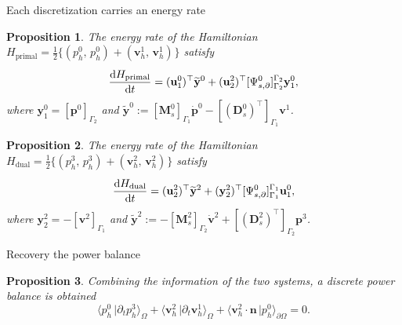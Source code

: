 \documentclass[aspectratio=169]{beamer}
\newcommand{\inpr}[3][]{\ensuremath{( #2, \, #3 )_{#1}}}
\newcommand{\dualpr}[3][]{\ensuremath{\langle #2 \, \vert #3 \rangle_{#1}}}
\newtheorem{proposition}{Proposition}
\begin{document}
\begin{frame}{Each discretization carries an energy rate}
	
	\begin{proposition}
		The energy rate of the Hamiltonian $H_{\mathrm{primal}} = \frac{1}{2}\{\inpr{p^0_h}{p^0_h} + \inpr{\bm{v}^1_h}{\bm{v}^1_h}\}$ satisfy
		\begin{equation*}
			\diff{{H}_{\mathrm{primal}}}{t} = (\mathbf{u}^{0}_1)^\top \widetilde{\mathbf{y}}^{0} + ({\mathbf{u}}^{2}_2)^\top[{\Psi}^{0}_{s, \partial}]_{\Gamma_2}^{\Gamma_2} \mathbf{y}^{0}_1,
		\end{equation*} 
		where ${\mathbf{y}}^{0}_1 = [\mathbf{p}^{0}]_{\Gamma_2}$ and $
			\widetilde{\mathbf{y}}^{0} := [\mathbf{M}^{0}_{s}]_{\Gamma_1} \dot{\mathbf{p}}^{0} -[(\mathbf{D}_{s}^{0})^\top]_{\Gamma_1} {\mathbf{v}}^1$.
	\end{proposition}

	\begin{proposition}
		The energy rate of the Hamiltonian $H_{\mathrm{dual}} = \frac{1}{2}\{\inpr{p^3_h}{p^3_h} + \inpr{\bm{v}^2_h}{\bm{v}^2_h}\}$ satisfy
	\begin{equation*}
		\diff{{H}_{\mathrm{dual}}}{t} = ({\mathbf{u}}^{2}_2)^\top \widetilde{\mathbf{y}}^{2} + (\mathbf{y}^{2}_2)^\top[{\Psi}^{0}_{s, \partial}]_{\Gamma_1}^{\Gamma_1} \mathbf{u}^{0}_1, 
	\end{equation*} 
	where ${\mathbf{y}}^{2}_2 = -[{\mathbf{v}}^{2}]_{\Gamma_1}$ and $\widetilde{\mathbf{y}}^{2} :=  -[\mathbf{M}^{2}_{s}]_{\Gamma_2} \dot{{\mathbf{v}}}^{2}  +[(\mathbf{D}_{s}^{2})^\top]_{\Gamma_2} {\mathbf{p}}^3$.
	\end{proposition}
\end{frame}

\begin{frame}{Recovery the power balance}
	
	\begin{proposition}
		Combining the information of the two systems, a discrete power balance is obtained
	\begin{equation*}
		\dualpr[\Omega]{p^{0}_h}{\partial_t p^3_h} + \dualpr[\Omega]{\bm{v}^{2}_h}{\partial_t \bm{v}^{1}_h} + \dualpr[\partial \Omega]{\bm{v}^2_h \cdot \bm{n}}{p_{h}^{0}} = 0.
	\end{equation*}

	\end{proposition}
	
\end{frame}
\end{document}
